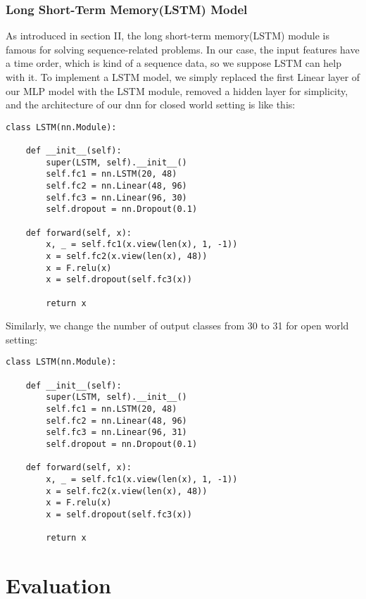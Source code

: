 \documentclass[conference]{IEEEtran}
\begin{document}
\subsubsection{Long Short-Term Memory(LSTM) Model}
As introduced in section II, the long short-term memory(LSTM) module is famous for solving sequence-related problems. In our case, the input features have a time order, which is kind of a sequence data, so we suppose LSTM can help with it. To implement a LSTM model, we simply replaced the first Linear layer of our MLP model with the LSTM module, removed a hidden layer for simplicity, and the architecture of our dnn for closed world setting is like this:
\begin{lstlisting}
class LSTM(nn.Module):
    
    def __init__(self):
        super(LSTM, self).__init__()
        self.fc1 = nn.LSTM(20, 48)
        self.fc2 = nn.Linear(48, 96)
        self.fc3 = nn.Linear(96, 30)
        self.dropout = nn.Dropout(0.1)
        
    def forward(self, x):
        x, _ = self.fc1(x.view(len(x), 1, -1))
        x = self.fc2(x.view(len(x), 48))
        x = F.relu(x)
        x = self.dropout(self.fc3(x))
        
        return x
\end{lstlisting}
Similarly, we change the number of output classes from 30 to 31 for open world setting:
\begin{lstlisting}
class LSTM(nn.Module):
    
    def __init__(self):
        super(LSTM, self).__init__()
        self.fc1 = nn.LSTM(20, 48)
        self.fc2 = nn.Linear(48, 96)
        self.fc3 = nn.Linear(96, 31)
        self.dropout = nn.Dropout(0.1)
        
    def forward(self, x):
        x, _ = self.fc1(x.view(len(x), 1, -1))
        x = self.fc2(x.view(len(x), 48))
        x = F.relu(x)
        x = self.dropout(self.fc3(x))
        
        return x
\end{lstlisting}

\section{Evaluation}
\end{document}
